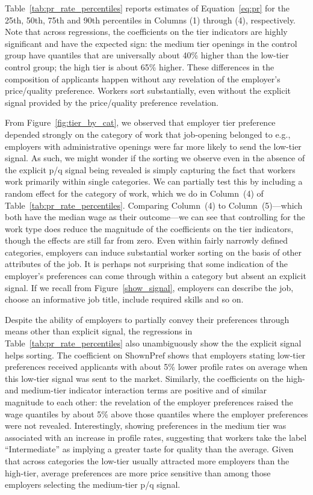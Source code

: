 \documentclass[prodmode,acmec]{ec-acmsmall}
\newcommand{\important}[1]{#1}
\newcommand{\quantclaim}[1]{#1}
\begin{document}
Table~\ref{tab:pr_rate_percentiles} reports estimates of Equation~\ref{eq:pr} for the 25th, 50th, 75th and 90th percentiles in Columns (1) through (4), respectively. 
Note that across regressions, the coefficients on the tier indicators are highly significant and have the expected sign: 
\quantclaim{the medium tier openings in the control group have quantiles that are universally about 40\% higher than the low-tier control group; the high tier is about 65\% higher.} 
These differences in the composition of applicants happen without any revelation of the employer's price/quality preference. 
\quantclaim{Workers sort substantially, even without the explicit signal provided by the price/quality preference revelation.}

From Figure~\ref{fig:tier_by_cat}, we observed that employer tier preference depended strongly on the category of work that job-opening belonged to e.g., employers with administrative openings were far more likely to send the low-tier signal.
As such, we might wonder if the sorting we observe even in the absence of the explicit p/q signal being revealed is simply capturing the fact that workers work primarily within single categories.
We can partially test this by including a random effect for the category of work, which we do in Column~(4) of Table~\ref{tab:pr_rate_percentiles}. 
Comparing Column~(4) to Column~(5)---which both have the median wage as their outcome---we can see that controlling for the work type does reduce the magnitude of the coefficients on the tier indicators, though the effects are still far from zero.
\important{Even within fairly narrowly defined categories, employers can induce substantial worker sorting on the basis of other attributes of the job.}
It is perhaps not surprising that some indication of the employer's preferences can come through within a category but absent an explicit signal.
If we recall from Figure~\ref{show_signal}, employers can describe the job, choose an informative job title, include required skills and so on.

\important{Despite the ability of employers to partially convey their preferences through means other than explicit signal, the regressions in Table~\ref{tab:pr_rate_percentiles} also unambiguously show the the explicit signal helps sorting.}
The coefficient on $\mbox{ShownPref}$ shows that employers stating low-tier preferences received applicants with about 5\% lower profile rates on average when this low-tier signal was sent to the market. 
Similarly, the coefficients on the high- and medium-tier indicator interaction terms are positive and of similar magnitude to each other: 
\quantclaim{the revelation of the employer preferences raised the wage quantiles by about 5\% above those quantiles where the employer preferences were not revealed.}
Interestingly, showing preferences in the medium tier was associated with an increase in profile rates, suggesting that workers take the label ``Intermediate'' as implying a greater taste for quality than the average.
Given that across categories the low-tier usually attracted more employers than the high-tier, average preferences are more price sensitive than among those employers selecting the medium-tier p/q signal.  
\end{document}
